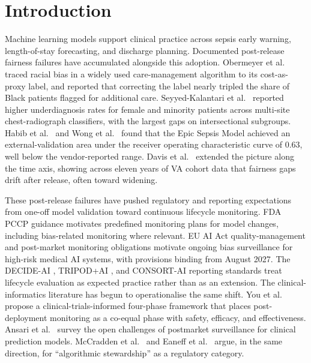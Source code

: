 \documentclass[acmsmall,nonacm,review,anonymous]{acmart}
\newcommand{\1}[1]{\mathbf{1}\!\left\{#1\right\}}
\begin{document}

\maketitle

\section{Introduction}\label{sec:intro}

Machine learning models support clinical practice across sepsis early warning, length-of-stay forecasting, and discharge planning. Documented post-release fairness failures have accumulated alongside this adoption. Obermeyer et al.\ \cite{obermeyer2019} traced racial bias in a widely used care-management algorithm to its cost-as-proxy label, and reported that correcting the label nearly tripled the share of Black patients flagged for additional care. Seyyed-Kalantari et al.\ \cite{seyyed2021} reported higher underdiagnosis rates for female and minority patients across multi-site chest-radiograph classifiers, with the largest gaps on intersectional subgroups. Habib et al.\ \cite{habib2021} and Wong et al.\ \cite{wong2021} found that the Epic Sepsis Model achieved an external-validation area under the receiver operating characteristic curve of 0.63, well below the vendor-reported range. Davis et al.\ \cite{davis2025} extended the picture along the time axis, showing across eleven years of VA cohort data that fairness gaps drift after release, often toward widening.

These post-release failures have pushed regulatory and reporting expectations from one-off model validation toward continuous lifecycle monitoring. FDA PCCP guidance \cite{fda2024pccp} motivates predefined monitoring plans for model changes, including bias-related monitoring where relevant. EU AI Act \cite{eu2024aiact} quality-management and post-market monitoring obligations motivate ongoing bias surveillance for high-risk medical AI systems, with provisions binding from August 2027. The DECIDE-AI \cite{rivera2022}, TRIPOD+AI \cite{collins2024tripod}, and CONSORT-AI \cite{liu2022spirit} reporting standards treat lifecycle evaluation as expected practice rather than as an extension. The clinical-informatics literature has begun to operationalise the same shift. You et al.\ \cite{you2025clinicaltrials} propose a clinical-trials-informed four-phase framework that places post-deployment monitoring as a co-equal phase with safety, efficacy, and effectiveness. Ansari et al.\ \cite{ansari2025postmarket} survey the open challenges of postmarket surveillance for clinical prediction models. McCradden et al.\ \cite{mccradden2020} and Eaneff et al.\ \cite{eaneff2020} argue, in the same direction, for ``algorithmic stewardship'' as a regulatory category.
\end{document}
